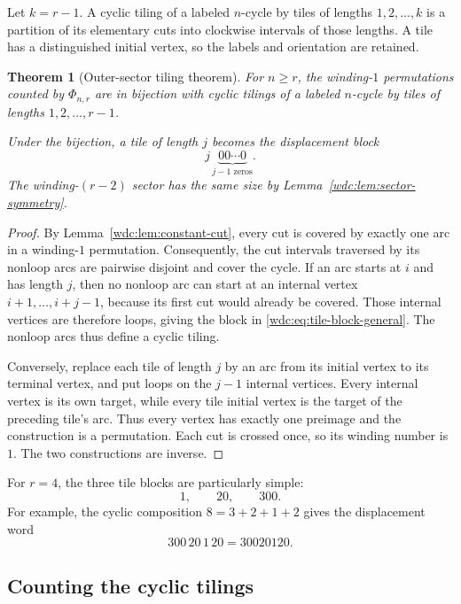 \documentclass[11pt,letterpaper]{article}
\numberwithin{equation}{section}
\newtheorem{theorem}{Theorem}[section]
\theoremstyle{definition}
\begin{document}
Let $k=r-1$.  A cyclic tiling of a labeled $n$-cycle by tiles of lengths
$1,2,\dots,k$ is a partition of its elementary cuts into clockwise intervals
of those lengths.  A tile has a distinguished initial vertex, so the labels
and orientation are retained.

\begin{theorem}[Outer-sector tiling theorem]\label{wdc:thm:outer-sector}
For $n\ge r$, the winding-$1$ permutations counted by $\Phi_{n,r}$ are in
bijection with cyclic tilings of a labeled $n$-cycle by tiles of lengths
$1,2,\dots,r-1$.

Under the bijection, a tile of length $j$ becomes the displacement block
\begin{equation}\label{wdc:eq:tile-block-general}
  j\,\underbrace{00\cdots0}_{j-1\text{ zeros}}.
\end{equation}
The winding-$(r-2)$ sector has the same size by
Lemma~\ref{wdc:lem:sector-symmetry}.
\end{theorem}

\begin{proof}
By Lemma~\ref{wdc:lem:constant-cut}, every cut is covered by exactly one arc in a
winding-$1$ permutation.  Consequently, the cut intervals traversed by its
nonloop arcs are pairwise disjoint and cover the cycle.  If an arc starts at
$i$ and has length $j$, then no nonloop arc can start at an internal vertex
$i+1,\dots,i+j-1$, because its first cut would already be covered.  Those
internal vertices are therefore loops, giving the block in
\eqref{wdc:eq:tile-block-general}.  The nonloop arcs thus define a cyclic tiling.

Conversely, replace each tile of length $j$ by an arc from its initial vertex
to its terminal vertex, and put loops on the $j-1$ internal vertices.  Every
internal vertex is its own target, while every tile initial vertex is the
target of the preceding tile's arc.  Thus every vertex has exactly one
preimage and the construction is a permutation.  Each cut is crossed once, so
its winding number is $1$.  The two constructions are inverse.
\end{proof}

For $r=4$, the three tile blocks are particularly simple:
\begin{equation}\label{wdc:eq:blocks-123}
  1,\qquad 20,\qquad 300.
\end{equation}
For example, the cyclic composition $8=3+2+1+2$ gives the displacement word
\[
  300\,20\,1\,20=30020120.
\]

\subsection{Counting the cyclic tilings}
\end{document}
